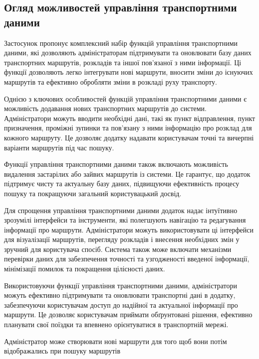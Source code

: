 \subsection{Огляд можливостей управління транспортними даними}
\label{subsec:route-management-subsection}

Застосунок пропонує комплексний набір функцій управління транспортними даними, які дозволяють адміністраторам підтримувати та оновлювати базу даних транспортних маршрутів, розкладів та іншої пов'язаної з ними інформації. Ці функції дозволяють легко інтегрувати нові маршрути, вносити зміни до існуючих маршрутів та ефективно обробляти зміни в розкладі руху транспорту.

Однією з ключових особливостей функцій управління транспортними даними є можливість додавання нових транспортних маршрутів до системи. Адміністратори можуть вводити необхідні дані, такі як пункт відправлення, пункт призначення, проміжні зупинки та пов'язану з ними інформацію про розклад для кожного маршруту. Це дозволяє додатку надавати користувачам точні та вичерпні варіанти маршрутів під час пошуку.

Функції управління транспортними даними також включають можливість видалення застарілих або зайвих маршрутів із системи. Це гарантує, що додаток підтримує чисту та актуальну базу даних, підвищуючи ефективність процесу пошуку та покращуючи загальний користувацький досвід.

Для спрощення управління транспортними даними додаток надає інтуїтивно зрозумілі інтерфейси та інструменти, які полегшують навігацію та редагування інформації про маршрути. Адміністратори можуть використовувати ці інтерфейси для візуалізації маршрутів, перегляду розкладів і внесення необхідних змін у зручний для користувача спосіб. Система також може включати механізми перевірки даних для забезпечення точності та узгодженості введеної інформації, мінімізації помилок та покращення цілісності даних.

Використовуючи функції управління транспортними даними, адміністратори можуть ефективно підтримувати та оновлювати транспортні дані в додатку, забезпечуючи користувачам доступ до надійної та актуальної інформації про маршрути. Це дозволяє користувачам приймати обґрунтовані рішення, ефективно планувати свої поїздки та впевнено орієнтуватися в транспортній мережі.

Адміністратор може створювати нові маршрути для того щоб вони потім відображались при пошуку маршрутів

